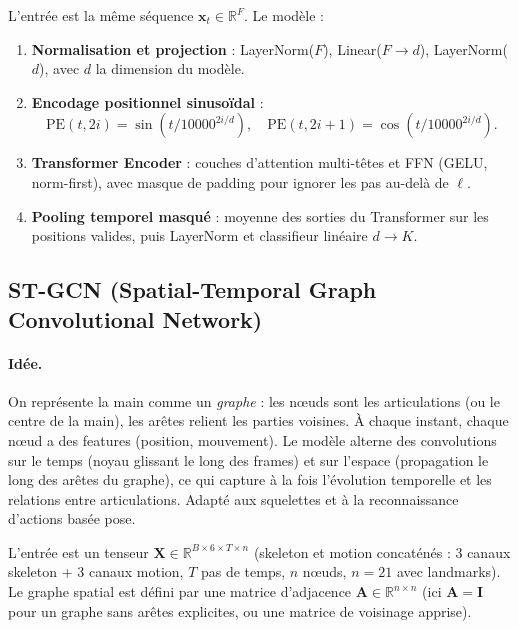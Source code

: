 \documentclass[11pt,a4paper]{article}
\begin{document}
L’entrée est la même séquence $\mathbf{x}_t \in \mathbb{R}^F$. Le modèle :
\begin{enumerate}
  \item \textbf{Normalisation et projection} : LayerNorm($F$), Linear($F \to d$), LayerNorm($d$), avec $d$ la dimension du modèle.
  \item \textbf{Encodage positionnel sinusoïdal} :
  \begin{equation}
    \mathrm{PE}(t, 2i) = \sin(t / 10000^{2i/d}), \quad \mathrm{PE}(t, 2i+1) = \cos(t / 10000^{2i/d}).
  \end{equation}
  \item \textbf{Transformer Encoder} : couches d’attention multi-têtes et FFN (GELU, norm-first), avec masque de padding pour ignorer les pas au-delà de $\ell$.
  \item \textbf{Pooling temporel masqué} : moyenne des sorties du Transformer sur les positions valides, puis LayerNorm et classifieur linéaire $d \to K$.
\end{enumerate}

\subsection{ST-GCN (Spatial-Temporal Graph Convolutional Network)}

\paragraph{Idée.} On représente la main comme un \emph{graphe} : les nœuds sont les articulations (ou le centre de la main), les arêtes relient les parties voisines. À chaque instant, chaque nœud a des features (position, mouvement). Le modèle alterne des convolutions sur le temps (noyau glissant le long des frames) et sur l’espace (propagation le long des arêtes du graphe), ce qui capture à la fois l’évolution temporelle et les relations entre articulations. Adapté aux squelettes et à la reconnaissance d’actions basée pose.

L’entrée est un tenseur $\mathbf{X} \in \mathbb{R}^{B \times 6 \times T \times n}$ (skeleton et motion concaténés : 3 canaux skeleton + 3 canaux motion, $T$ pas de temps, $n$ nœuds, $n=21$ avec landmarks). Le graphe spatial est défini par une matrice d’adjacence $\mathbf{A} \in \mathbb{R}^{n \times n}$ (ici $\mathbf{A} = \mathbf{I}$ pour un graphe sans arêtes explicites, ou une matrice de voisinage apprise).
\end{document}
